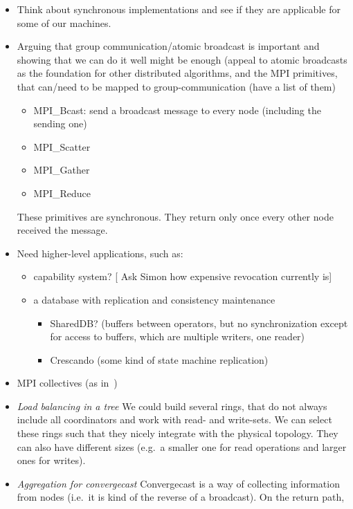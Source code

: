 \documentclass{article}
\newcommand{\stefan}[1]{
  {\color{skRed}[{\color{red}{SK}} #1]}}
\begin{document}
\begin{itemize}
\item Think about synchronous implementations and see if they are
  applicable for some of our machines.
\item Arguing that group communication/atomic broadcast is important
  and showing that we can do it well might be enough (appeal to atomic
  broadcasts as the foundation for other distributed algorithms, and
  the MPI primitives, that can/need to be mapped to
  group-communication (have a list of them)
  \begin{itemize}
  \item MPI\_Bcast: send a broadcast message to every node (including
    the sending one)
  \item MPI\_Scatter
  \item MPI\_Gather
  \item MPI\_Reduce
  \end{itemize}
  These primitives are synchronous. They return only once every other
  node received the message. 
\item Need higher-level applications, such as:
  \begin{itemize}
  \item capability system? \stefan{Ask Simon how expensive revocation
      currently is}
  \item a database with replication and consistency maintenance
    \begin{itemize}
    \item SharedDB? (buffers between operators, but no synchronization
      except for access to buffers, which are multiple writers, one
      reader)
    \item Crescando (some kind of state machine replication)
    \end{itemize}
  \end{itemize}
\item MPI collectives (as in~\cite{Tu2008})
\item \emph{Load balancing in a tree} We could build several rings,
  that do not always include all coordinators and work with read- and
  write-sets. We can select these rings such that they nicely
  integrate with the physical topology. They can also have different
  sizes (e.g.\ a smaller one for read operations and larger ones for
  writes).
\item \emph{Aggregation for convergecast} %
  Convergecast is a way of collecting information from nodes (i.e.\ it
  is kind of the reverse of a broadcast). On the return path,

\end{itemize}
\end{document}
